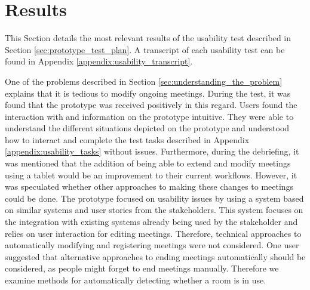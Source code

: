\section{Results}\label{sec:usability_evaluation_results}
This Section details the most relevant results of the usability test described in Section \ref{sec:prototype_test_plan}.
A transcript of each usability test can be found in Appendix \ref{appendix:usability_transcript}.

One of the problems described in Section \ref{sec:understanding_the_problem} explains that it is tedious to modify ongoing meetings. 
During the test, it was found that the prototype was received positively in this regard. 
Users found the interaction with and information on the prototype intuitive. 
They were able to understand the different situations depicted on the prototype and understood how to interact and complete the test tasks described in Appendix \ref{appendix:usability_tasks} without issues. 
Furthermore, during the debriefing, it was mentioned that the addition of being able to extend and modify meetings using a tablet would be an improvement to their current workflows.
However, it was speculated whether other approaches to making these changes to meetings could be done. 
The prototype focused on usability issues by using a system based on similar systems and user stories from the stakeholders. 
This system focuses on the integration with existing systems already being used by the stakeholder and relies on user interaction for editing meetings. 
Therefore, technical approaches to automatically modifying and registering meetings were not considered. 
One user suggested that alternative approaches to ending meetings automatically should be considered, as people might forget to end meetings manually.
Therefore we examine methods for automatically detecting whether a room is in use.

